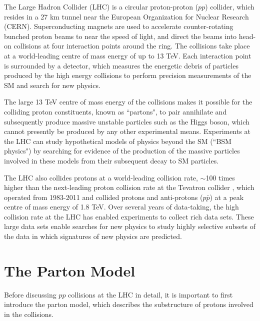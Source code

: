 \label{chapter:lhc_atlas}

The Large Hadron Collider (LHC) \cite{lhc_machine} is a circular proton-proton (\(pp\)) collider, which resides in a 27 km tunnel near the European Organization for Nuclear Research (CERN). Superconducting magnets are used to accelerate counter-rotating bunched proton beams to near the speed of light, and direct the beams into head-on collisions at four interaction points around the ring. The collisions take place at a world-leading centre of mass energy of up to 13 TeV. Each interaction point is surrounded by a detector, which measures the energetic debris of particles produced by the high energy collisions to perform precision measurements of the SM and search for new physics.

The large 13 TeV centre of mass energy of the collisions makes it possible for the colliding proton constituents, known as ``partons", to pair annihilate and subsequently produce massive unstable particles such as the Higgs boson, which cannot presently be produced by any other experimental means. Experiments at the LHC can study hypothetical models of physics beyond the SM (``BSM physics") by searching for evidence of the production of the massive particles involved in these models from their subsequent decay to SM particles.

The LHC also collides protons at a world-leading collision rate, \(\sim\)100 times higher than the next-leading proton collision rate at the Tevatron collider \cite{tevatron}, which operated from 1983-2011 and collided protons and anti-protons (\(p\bar{p}\)) at a peak centre of mass energy of 1.8 TeV. Over several years of data-taking, the high collision rate at the LHC has enabled experiments to collect rich data sets. These large data sets enable searches for new physics to study highly selective subsets of the data in which signatures of new physics are predicted.

\section{The Parton Model}
\label{sec:parton_model}

Before discussing \(pp\) collisions at the LHC in detail, it is important to first introduce the parton model, which describes the substructure of protons involved in the collisions. 

